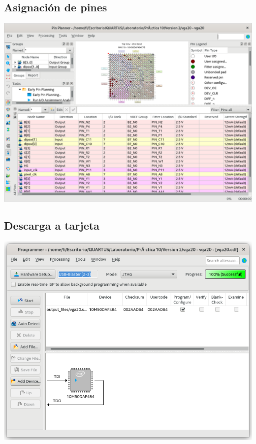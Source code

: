 \documentclass[10pt,a4paper]{article}
\begin{document}
	
	\subsection{Asignación de pines}
	\begin{center}
		\includegraphics[scale=0.35]{Pines.png}
	\end{center}
	
	\subsection{Descarga a tarjeta}
	\begin{center}
		\includegraphics[scale=0.35]{Descarga.png}
	\end{center}
	
\end{document}
